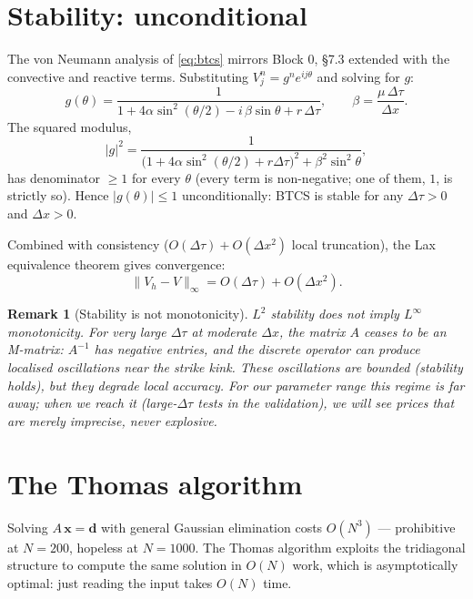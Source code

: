 \documentclass[11pt,a4paper]{article}
\newtheorem{remark}[proposition]{Remark}
\begin{document}
\section{Stability: unconditional}

The von Neumann analysis of \eqref{eq:btcs} mirrors Block 0, §7.3
extended with the convective and reactive terms. Substituting
$V_j^n = g^n e^{ij\theta}$ and solving for $g$:
\begin{equation}
g(\theta) = \frac{1}{1 + 4\alpha\sin^2(\theta/2) - i\,\beta\sin\theta + r\,\Delta\tau},
\qquad \beta = \frac{\mu\,\Delta\tau}{\Delta x}.
\label{eq:btcs-amplification}
\end{equation}
The squared modulus,
\[
|g|^2 = \frac{1}{\bigl(1 + 4\alpha\sin^2(\theta/2) + r\Delta\tau\bigr)^2 + \beta^2\sin^2\theta},
\]
has denominator $\ge 1$ for every $\theta$ (every term is
non-negative; one of them, $1$, is strictly so). Hence $|g(\theta)|
\le 1$ unconditionally: BTCS is stable for any $\Delta\tau > 0$ and
$\Delta x > 0$.

Combined with consistency ($O(\Delta\tau) + O(\Delta x^2)$ local
truncation), the Lax equivalence theorem gives convergence:
\[
\|V_h - V\|_\infty = O(\Delta\tau) + O(\Delta x^2).
\]

\begin{remark}[Stability is not monotonicity]
$L^2$ stability does not imply $L^\infty$ monotonicity. For very
large $\Delta\tau$ at moderate $\Delta x$, the matrix $A$ ceases to
be an M-matrix: $A^{-1}$ has negative entries, and the discrete
operator can produce localised oscillations near the strike kink.
These oscillations are bounded (stability holds), but they degrade
local accuracy. For our parameter range this regime is far away;
when we reach it (large-$\Delta\tau$ tests in the validation), we
will see prices that are merely imprecise, never explosive.
\end{remark}

\section{The Thomas algorithm}

Solving $A\,\mathbf{x} = \mathbf{d}$ with general Gaussian elimination
costs $O(N^3)$ — prohibitive at $N = 200$, hopeless at $N = 1000$.
The Thomas algorithm exploits the tridiagonal structure to compute
the same solution in $O(N)$ work, which is asymptotically optimal:
just reading the input takes $O(N)$ time.
\end{document}
